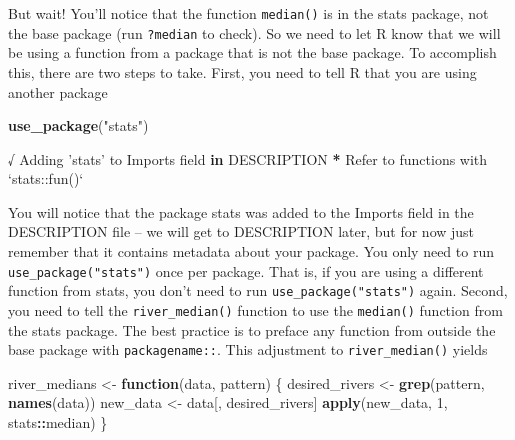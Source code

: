 \documentclass[
]{book}
\newenvironment{Shaded}{\begin{snugshade}}{\end{snugshade}}
\newcommand{\ControlFlowTok}[1]{\textcolor[rgb]{0.13,0.29,0.53}{\textbf{#1}}}
\newcommand{\DataTypeTok}[1]{\textcolor[rgb]{0.13,0.29,0.53}{#1}}
\newcommand{\DecValTok}[1]{\textcolor[rgb]{0.00,0.00,0.81}{#1}}
\newcommand{\KeywordTok}[1]{\textcolor[rgb]{0.13,0.29,0.53}{\textbf{#1}}}
\newcommand{\NormalTok}[1]{#1}
\newcommand{\OperatorTok}[1]{\textcolor[rgb]{0.81,0.36,0.00}{\textbf{#1}}}
\newcommand{\StringTok}[1]{\textcolor[rgb]{0.31,0.60,0.02}{#1}}
\begin{document}
But wait! You'll notice that the function \texttt{median()} is in the stats package, not the base package (run \texttt{?median} to check). So we need to let R know that we will be using a function from a package that is not the base package. To accomplish this, there are two steps to take. First, you need to tell R that you are using another package

\begin{Shaded}
\begin{Highlighting}[]
\KeywordTok{use_package}\NormalTok{(}\StringTok{"stats"}\NormalTok{)}
\end{Highlighting}
\end{Shaded}

\begin{Shaded}
\begin{Highlighting}[]
\NormalTok{√ Adding }\StringTok{'stats'}\NormalTok{ to Imports field }\ControlFlowTok{in}\NormalTok{ DESCRIPTION}
\OperatorTok{*}\StringTok{ }\NormalTok{Refer to functions with }\StringTok{`}\DataTypeTok{stats::fun()}\StringTok{`}
\end{Highlighting}
\end{Shaded}

You will notice that the package stats was added to the Imports field in the DESCRIPTION file -- we will get to DESCRIPTION later, but for now just remember that it contains metadata about your package. You only need to run \texttt{use\_package("stats")} once per package. That is, if you are using a different function from stats, you don't need to run \texttt{use\_package("stats")} again. Second, you need to tell the \texttt{river\_median()} function to use the \texttt{median()} function from the stats package. The best practice is to preface any function from outside the base package with \texttt{packagename::}. This adjustment to \texttt{river\_median()} yields

\begin{Shaded}
\begin{Highlighting}[]
\NormalTok{river_medians <-}\StringTok{ }\ControlFlowTok{function}\NormalTok{(data, pattern) \{}
\NormalTok{  desired_rivers <-}\StringTok{ }\KeywordTok{grep}\NormalTok{(pattern, }\KeywordTok{names}\NormalTok{(data))}
\NormalTok{  new_data <-}\StringTok{ }\NormalTok{data[, desired_rivers]}
  \KeywordTok{apply}\NormalTok{(new_data, }\DecValTok{1}\NormalTok{, stats}\OperatorTok{::}\NormalTok{median)}
\NormalTok{\}}
\end{Highlighting}
\end{Shaded}
\end{document}
